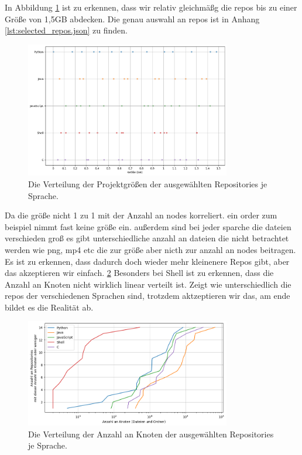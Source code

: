 In Abbildung \ref{fig:repoGroesseVerteilung} ist zu erkennen, dass wir relativ gleichmäßg die repos bis zu einer Größe von 1,5GB abdecken.  Die genau auswahl an repos ist in Anhang \ref{lst:selected_repos.json} zu finden.
\begin{figure}
    \centering
    \includegraphics[width=0.8\textwidth]{images/datenanalyse/repoGrößeVerteilung.png}
    \caption{Die Verteilung der Projektgrößen der ausgewählten Repositories je Sprache.}
    \label{fig:repoGroesseVerteilung}
\end{figure}

Da die größe nicht 1 zu 1 mit der Anzahl an nodes korreliert. ein order zum beispiel nimmt fast keine größe ein. außerdem sind bei jeder sparche die dateien verschieden groß es gibt unterschiedliche anzahl an dateien die nicht betrachtet werden wie png, mp4 etc die zur größe aber nicth zur anzahl an nodes beitragen. Es ist zu erkennen, dass dadurch doch wieder mehr kleinenere Repos gibt, aber das akzeptieren wir einfach. \ref{fig:repoAnzahlNodesVerteilung} Besonders bei Shell ist zu erkennen, dass die Anzahl an Knoten nicht wirklich linear verteilt ist. Zeigt wie unterschiedlich die repos der verschiedenen Sprachen sind, trotzdem aktzeptieren wir das, am ende bildet es die Realität ab.

\begin{figure}
    \centering
    \includegraphics[width=0.8\textwidth]{images/datenanalyse/repoAnzahlNodesVerteilung.png}
    \caption{Die Verteilung der Anzahl an Knoten der ausgewählten Repositories je Sprache.}
    \label{fig:repoAnzahlNodesVerteilung}
\end{figure}

